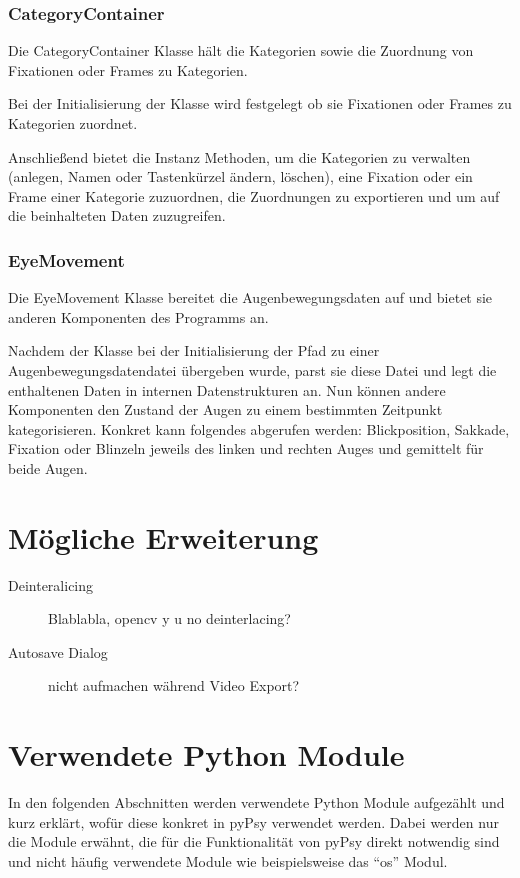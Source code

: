 \documentclass[a4paper,draft]{scrartcl}
\begin{document}
\subsubsection{CategoryContainer}
Die CategoryContainer Klasse hält die Kategorien sowie die Zuordnung von Fixationen oder Frames zu Kategorien.

Bei der Initialisierung der Klasse wird festgelegt ob sie Fixationen oder Frames zu Kategorien zuordnet.

Anschließend bietet die Instanz Methoden, um die Kategorien zu verwalten (anlegen, Namen oder Tastenkürzel ändern, löschen), eine Fixation oder ein Frame einer Kategorie zuzuordnen, die Zuordnungen zu exportieren und um auf die beinhalteten Daten zuzugreifen.

\subsubsection{EyeMovement}
Die EyeMovement Klasse bereitet die Augenbewegungsdaten auf und bietet sie anderen Komponenten des Programms an.

Nachdem der Klasse bei der Initialisierung der Pfad zu einer Augenbewegungsdatendatei übergeben wurde, parst sie diese Datei und legt die enthaltenen Daten in internen Datenstrukturen an. Nun können andere Komponenten den Zustand der Augen zu einem bestimmten Zeitpunkt kategorisieren. Konkret kann folgendes abgerufen werden: Blickposition, Sakkade, Fixation oder Blinzeln jeweils des linken und rechten Auges und gemittelt für beide Augen.

\section{M\"ogliche Erweiterung}
  \begin{description}
    \item[Deinteralicing] Blablabla, opencv y u no deinterlacing?
    \item[Autosave Dialog] nicht aufmachen während Video Export?
  \end{description}

\section{Verwendete Python Module}
In den folgenden Abschnitten werden verwendete Python Module aufgezählt und kurz erklärt, wofür diese konkret in pyPsy verwendet werden. Dabei werden nur die Module erwähnt, die für die Funktionalität von pyPsy direkt notwendig sind und nicht häufig verwendete Module wie beispielsweise das "`os"' Modul. 
\end{document}
